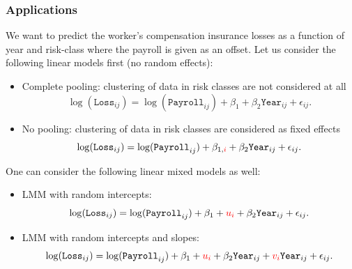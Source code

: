 \documentclass[ignorenonframetext,]{beamer}
\begin{document}
\begin{frame}[allowframebreaks]
\frametitle{Applications}

\begin{exam}
We want to predict the worker's compensation insurance losses as a function of year and risk-class where the payroll is given as an offset. Let us consider the following linear models first (no random effects):
\begin{itemize}
	\item Complete pooling: clustering of data in risk classes are not considered at all
$$
\log (\texttt{Loss}_{ij}) = \log (\texttt{Payroll}_{ij}) +\beta_1 + \beta_2 \texttt{Year}_{ij}+ \epsilon_{ij}.
$$
	\item No pooling: clustering of data in risk classes are considered as fixed effects
$$
\log (\texttt{Loss}_{ij}) = \log (\texttt{Payroll}_{ij}) +\beta_{1, {\color{red}i}} + \beta_2 \texttt{Year}_{ij}+ \epsilon_{ij}.
$$
\end{itemize}

\end{exam}

\framebreak

One can consider the following linear mixed models as well:
\begin{itemize}
	\item LMM with random intercepts: 
$$
\log (\texttt{Loss}_{ij}) = \log (\texttt{Payroll}_{ij}) +\beta_1 + {\color{red}u_i}+ \beta_2 \texttt{Year}_{ij}+ \epsilon_{ij}.
$$
	\item LMM with random intercepts and slopes: 
$$
\log (\texttt{Loss}_{ij}) = \log (\texttt{Payroll}_{ij}) +\beta_1 + {\color{red}u_i}+ \beta_2 \texttt{Year}_{ij}+{\color{red}v_i} \texttt{Year}_{ij}+ \epsilon_{ij}.
$$
\end{itemize}

\end{frame}
\end{document}
